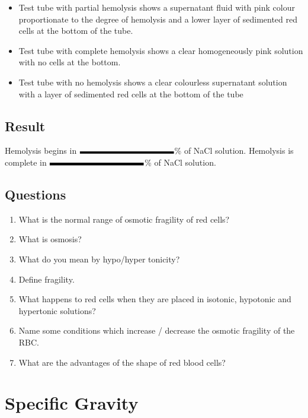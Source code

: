 \documentclass[a4paper,12pt]{book}
\begin{document}
														\begin{itemize}
															\item{Test tube with partial hemolysis shows a supernatant fluid with pink colour proportionate to the degree of hemolysis and a lower layer of sedimented red cells at the bottom of the tube.}
															\item{Test tube with complete hemolysis shows a clear homogeneously pink solution with no cells at the bottom.}
															\item{Test tube with no hemolysis shows a clear colourless supernatant solution with a layer of sedimented red cells at the bottom of the tube}
														\end{itemize}
														\section*{Result}
														Hemolysis begins in $\rule{4cm}{.1cm}$\% of NaCl solution.\newline
														Hemolysis is complete in $\rule{4cm}{.1cm}$\% of NaCl solution.
														\section*{Questions}
														\begin{enumerate}
															\item{What is the normal range of osmotic fragility of red cells?}
															\item{What is osmosis?}
															\item{What do you mean by hypo/hyper tonicity?}
															\item{Define fragility.}
															\item{What happens to red cells when they are placed in isotonic, hypotonic and hypertonic solutions?}
															\item{Name some conditions which increase / decrease the osmotic fragility of the RBC.}
															\item{What are the advantages of the shape of red blood cells?}
														\end{enumerate}	


														\chapter*{\centering Specific Gravity}
\end{document}
